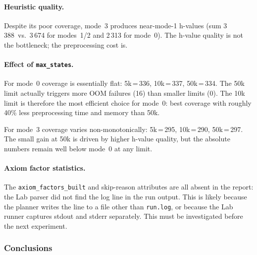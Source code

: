 \documentclass[11pt,a4paper]{article}
\begin{document}
\paragraph{Heuristic quality.}
Despite its poor coverage, mode~3 produces near-mode-1 h-values (sum
3\,388~vs.\ 3\,674 for modes~1/2 and 2\,313 for mode~0).  The h-value
quality is not the bottleneck; the preprocessing cost is.

\paragraph{Effect of \texttt{max\_states}.}
For mode~0 coverage is essentially flat: 5k\,=\,336, 10k\,=\,337, 50k\,=\,334.
The 50k limit actually triggers more OOM failures (16) than smaller limits (0).
The 10k limit is therefore the most efficient choice for mode~0: best coverage
with roughly 40\% less preprocessing time and memory than 50k.

For mode~3 coverage varies non-monotonically: 5k\,=\,295, 10k\,=\,290, 50k\,=\,297.
The small gain at 50k is driven by higher h-value quality, but the absolute
numbers remain well below mode~0 at any limit.

\paragraph{Axiom factor statistics.}
The \texttt{axiom\_factors\_built} and skip-reason attributes are all absent
in the report: the Lab parser did not find the log line in the run output.
This is likely because the planner writes the line to a file other than
\texttt{run.log}, or because the Lab runner captures stdout and stderr
separately.  This must be investigated before the next experiment.

\subsubsection*{Conclusions}
\end{document}
